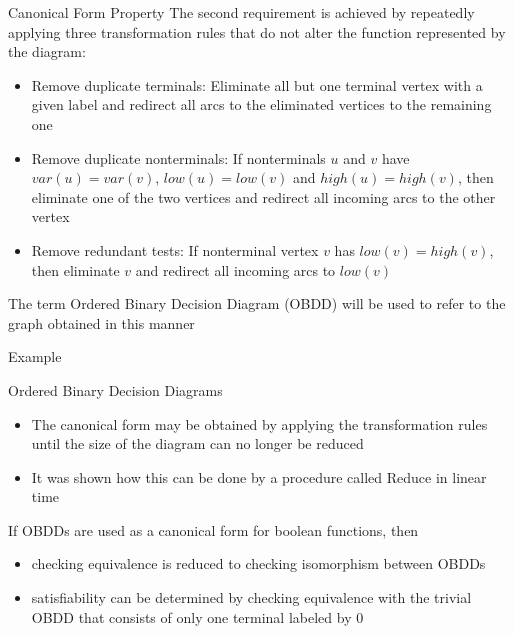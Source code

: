\documentclass{beamer}
\begin{document}
\begin{frame}{Canonical Form Property}
The second requirement is achieved by repeatedly applying three transformation rules that do not alter the function represented by the diagram:
\begin{itemize}
\item Remove duplicate terminals: Eliminate all but one terminal vertex with a given label and redirect all arcs to the eliminated vertices to the remaining one
\item Remove duplicate nonterminals: If nonterminals $u$ and $v$ have $var(u) = var(v)$, $low(u) = low(v)$ and $high(u) = high(v)$, then eliminate one of the two vertices and redirect all incoming arcs to the other vertex
\item Remove redundant tests: If nonterminal vertex $v$ has $low(v) = high(v)$, then eliminate $v$ and redirect all incoming arcs to $low(v)$
\end{itemize}
The term Ordered Binary Decision Diagram (OBDD) will be used to refer to the graph obtained in this manner
\end{frame}

\begin{frame}{Example}
\end{frame}

\begin{frame}{Ordered Binary Decision Diagrams}
\begin{itemize}
\item The canonical form may be obtained by applying the transformation rules until the size of the diagram can no longer be reduced
\item It was shown how this can be done by a procedure called Reduce in linear time
\end{itemize}
If OBDDs are used as a canonical form for boolean functions, then
\begin{itemize}
\item checking equivalence is reduced to checking isomorphism between OBDDs
\item satisfiability can be determined by checking equivalence with the trivial OBDD that consists of only one terminal labeled by 0
\end{itemize}
\end{frame}
\end{document}
